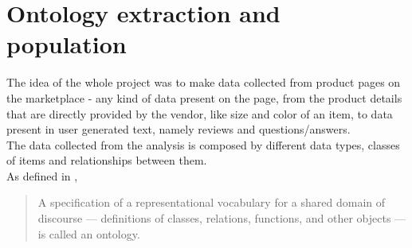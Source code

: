 \documentclass[LaM,oneside,binding=0.6cm]{sapthesis}
\begin{document}

\chapter{Ontology extraction and population}

The idea of the whole project was to make data collected from product pages on the marketplace - any kind of data present on the page, from the product details that are directly provided by the vendor, like size and color of an item, to data present in user generated text, namely reviews and questions/answers.
\\
The data collected from the analysis is composed by different data types, classes of items and relationships between them.
\\
As defined in \parencite{gruber_translation_1993}, 
\begin{quote}
A specification of a representational vocabulary for a shared domain of discourse — definitions of classes, relations, functions, and other objects — is called an ontology. 
\end{quote}
\end{document}
